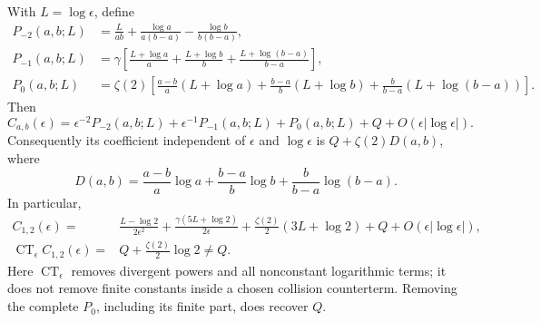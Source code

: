 \begin{theorem}
\label{cl:collision}
With $L=\log\epsilon$, define
\begin{align*}
 P_{-2}(a,b;L)&=\frac{L}{ab}
    +\frac{\log a}{a(b-a)}-\frac{\log b}{b(b-a)},\\
 P_{-1}(a,b;L)&=\gamma\left[
    \frac{L+\log a}{a}+\frac{L+\log b}{b}
    +\frac{L+\log(b-a)}{b-a}\right],\\
 P_0(a,b;L)&=\zeta(2)\left[
    \frac{a-b}{a}(L+\log a)
    +\frac{b-a}{b}(L+\log b)
    +\frac b{b-a}(L+\log(b-a))\right].
\end{align*}
Then
\begin{equation}\label{cl:rate-expansion}
 C_{a,b}(\epsilon)=\epsilon^{-2}P_{-2}(a,b;L)
    +\epsilon^{-1}P_{-1}(a,b;L)+P_0(a,b;L)+Q
    +O(\epsilon|\log\epsilon|).
\end{equation}
Consequently its coefficient independent of $\epsilon$ and $\log\epsilon$
is $Q+\zeta(2)D(a,b)$, where
\[
 D(a,b)=\frac{a-b}{a}\log a+\frac{b-a}{b}\log b
               +\frac b{b-a}\log(b-a).
\]
In particular,
\begin{align}
 C_{1,2}(\epsilon)
 ={}&\frac{L-\log2}{2\epsilon^2}
   +\frac{\gamma(5L+\log2)}{2\epsilon}
   +\frac{\zeta(2)}2(3L+\log2)+Q
   +O(\epsilon|\log\epsilon|),\label{cl:equally-spaced}\\
 \operatorname{CT}_{\epsilon}C_{1,2}(\epsilon)
 ={}&Q+\frac{\zeta(2)}2\log2\ne Q.\label{cl:finite-anomaly}
\end{align}
Here $\operatorname{CT}_{\epsilon}$ removes divergent powers and all
nonconstant logarithmic terms; it does not remove finite constants
inside a chosen collision counterterm. Removing the complete $P_0$,
including its finite part, does recover $Q$.
\end{theorem}

